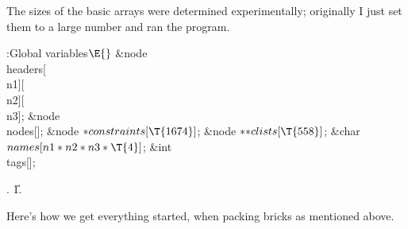 The sizes of the basic arrays were determined
experimentally; originally
I just set them to a large number and ran the program.

\Y\B\4:Global variables\X${}\E{}$\6
\&{node} \\{headers}[\\{n1}][\\{n2}][\\{n3}];\6
\&{node} \\{nodes}[];\6
\&{node} ${}{*}\\{constraints}[\T{1674}]{}$;\6
\&{node} ${}{*}{*}\\{clists}[\T{558}]{}$;\6
\&{char} ${}\\{names}[\\{n1}*\\{n2}*\\{n3}*\T{4}]{}$;\6
\&{int} \\{tags}[];%
\par
{}.
\U1.\fi

Here's how we get everything started, when packing bricks
as mentioned above.

